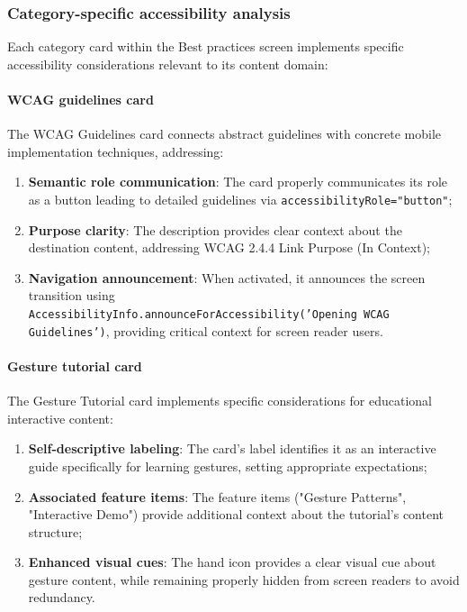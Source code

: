 \subsubsection{Category-specific accessibility analysis}

Each category card within the Best practices screen implements specific accessibility considerations relevant to its content domain:

\paragraph{WCAG guidelines card}

The WCAG Guidelines card connects abstract guidelines with concrete mobile implementation techniques, addressing:

\begin{enumerate}
    \item \textbf{Semantic role communication}: The card properly communicates its role as a button leading to detailed guidelines via \texttt{accessibilityRole="button"};
    
    \item \textbf{Purpose clarity}: The description provides clear context about the destination content, addressing WCAG 2.4.4 Link Purpose (In Context);
    
    \item \textbf{Navigation announcement}: When activated, it announces the screen transition using \\ \texttt{AccessibilityInfo.announceForAccessibility('Opening WCAG Guidelines')}, providing critical context for screen reader users.
\end{enumerate}

\paragraph{Gesture tutorial card}

The Gesture Tutorial card implements specific considerations for educational interactive content:

\begin{enumerate}
    \item \textbf{Self-descriptive labeling}: The card's label identifies it as an interactive guide specifically for learning gestures, setting appropriate expectations;
    
    \item \textbf{Associated feature items}: The feature items ("Gesture Patterns", "Interactive Demo") provide additional context about the tutorial's content structure;
    
    \item \textbf{Enhanced visual cues}: The hand icon provides a clear visual cue about gesture content, while remaining properly hidden from screen readers to avoid redundancy.
\end{enumerate}

